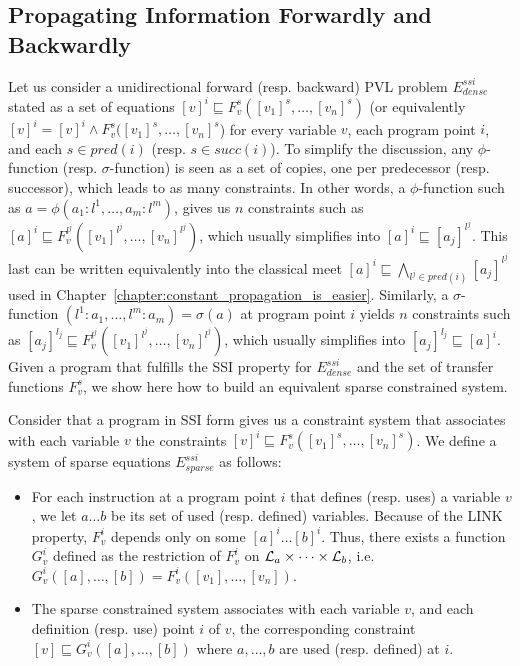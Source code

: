 \subsection{Propagating Information Forwardly and Backwardly}

Let us consider a unidirectional forward (resp. backward) PVL problem $E^{ssi}_{\mathit{dense}}$ stated as a set of equations $[v]^i \sqsubseteq  F_v^s([v_1]^s, \dots, [v_n]^s)$ (or equivalently $[v]^i = [v]^i \wedge    F_v^s([v_1]^s, \dots, [v_n]^s$) for every variable $v$, each program point $i$, and each $s \in \mathit{pred}(i)$ (resp. $s \in \mathit{succ}(i)$). 
To simplify the discussion, any $\phi$-function (resp. $\sigma$-function) is seen as a set of copies, one per predecessor (resp. successor), which leads to as many constraints.
In other words, a $\phi$-function such as $a=\phi(a_1:l^1,\dots,a_m:l^m)$, gives us $n$ constraints such as $[a]^i \sqsubseteq  F_v^{l^j}([v_1]^{l^j}, \dots, [v_n]^{l^j})$, which usually simplifies into $[a]^i \sqsubseteq [a_j]^{l^j}$. This last can be written equivalently into the classical meet $[a]^i \sqsubseteq \bigwedge_{l^j \in \mathit{pred}(i)} [a_j]^{l^j}$ used in Chapter~\ref{chapter:constant_propagation_is_easier}.
Similarly, a $\sigma$-function $(l^1:a_1,\dots,l^m:a_m)=\sigma(a)$ at program point $i$ yields $n$ constraints such as $[a_j]^{l_j} \sqsubseteq  F_v^{l^j}([v_1]^{l^j}, \dots, [v_n]^{l^j})$, which usually simplifies into $[a_j]^{l_j} \sqsubseteq [a]^i$.
Given a program that fulfills the SSI property for $E^{ssi}_{\mathit{dense}}$ and the set of transfer functions $F_v^s$, we show here how to build an equivalent sparse constrained system.  

\begin{definition}
\label{def:ssi_eq}
Consider that a program in SSI form gives us a constraint system that associates with each variable $v$ the constraints $[v]^i \sqsubseteq  F_v^s([v_1]^s, \dots, [v_n]^s)$. We define a system of sparse equations $E^{ssi}_{sparse}$ as follows:

\begin{itemize}

\item For each instruction at a program point $i$ that defines (resp. uses) a variable $v$, we let $a \dots b$ be its set of used (resp. defined) variables. Because of the LINK property, $F^i_v$ depends only on some $[a]^i \dots [b]^i$.
Thus, there exists a function $G^i_v$ defined as the restriction of $F^i_v$ on ${\cal L}_a\times \dots \times{\cal L}_b$, i.e. $G^i_v([a], \dots, [b]) = F^i_v([v_1],\dots, [v_n])$.

\item The sparse constrained system associates with each variable $v$, and each definition (resp. use) point $i$ of $v$, the corresponding constraint $[v]  \sqsubseteq G_v^i([a], \ldots, [b])$ where $a,\dots, b$ are used (resp. defined) at $i$.
\end{itemize}

\end{definition}

